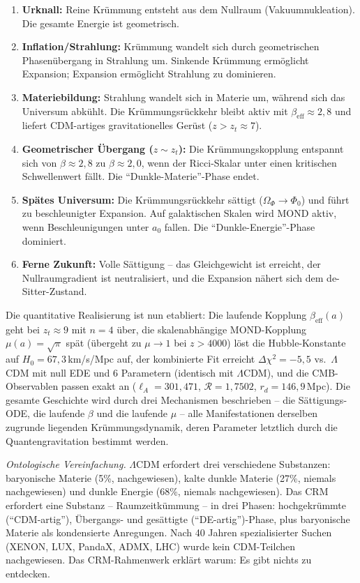 \documentclass[11pt,a4paper]{article}
\begin{document}
\begin{enumerate}
\item \textbf{Urknall:} Reine Kr\"ummung entsteht aus dem Nullraum (Vakuumnukleation). Die gesamte Energie ist geometrisch.
\item \textbf{Inflation/Strahlung:} Kr\"ummung wandelt sich durch geometrischen Phasen\"ubergang in Strahlung um. Sinkende Kr\"ummung erm\"oglicht Expansion; Expansion erm\"oglicht Strahlung zu dominieren.
\item \textbf{Materiebildung:} Strahlung wandelt sich in Materie um, w\"ahrend sich das Universum abk\"uhlt. Die Kr\"ummungsr\"uckkehr bleibt aktiv mit $\beta_{\mathrm{eff}} \approx 2{,}8$ und liefert CDM-artiges gravitationelles Ger\"ust ($z > z_t \approx 7$).
\item \textbf{Geometrischer \"Ubergang ($z \sim z_t$):} Die Kr\"ummungskopplung entspannt sich von $\beta \approx 2{,}8$ zu $\beta \approx 2{,}0$, wenn der Ricci-Skalar unter einen kritischen Schwellenwert f\"allt. Die "`Dunkle-Materie"'-Phase endet.
\item \textbf{Sp\"ates Universum:} Die Kr\"ummungsr\"uckkehr s\"attigt ($\Omega_\Phi \to \Phi_0$) und f\"uhrt zu beschleunigter Expansion. Auf galaktischen Skalen wird MOND aktiv, wenn Beschleunigungen unter $a_0$ fallen. Die "`Dunkle-Energie"'-Phase dominiert.
\item \textbf{Ferne Zukunft:} Volle S\"attigung -- das Gleichgewicht ist erreicht, der Nullraumgradient ist neutralisiert, und die Expansion n\"ahert sich dem de-Sitter-Zustand.
\end{enumerate}

Die quantitative Realisierung ist nun etabliert: Die laufende Kopplung $\beta_{\mathrm{eff}}(a)$ geht bei $z_t \approx 9$ mit $n = 4$ \"uber, die skalenabh\"angige MOND-Kopplung $\mu(a) = \sqrt{\pi}$ sp\"at (\"ubergeht zu $\mu \to 1$ bei $z > 4000$) l\"ost die Hubble-Konstante auf $H_0 = 67{,}3$\,km/s/Mpc auf, der kombinierte Fit erreicht $\Delta\chi^2 = -5{,}5$ vs.\ $\Lambda$CDM mit null EDE und 6 Parametern (identisch mit $\Lambda$CDM), und die CMB-Observablen passen exakt an ($\ell_A = 301{,}471$, $\mathcal{R} = 1{,}7502$, $r_d = 146{,}9$\,Mpc). Die gesamte Geschichte wird durch drei Mechanismen beschrieben -- die S\"attigungs-ODE, die laufende $\beta$ und die laufende $\mu$ -- alle Manifestationen derselben zugrunde liegenden Kr\"ummungsdynamik, deren Parameter letztlich durch die Quantengravitation bestimmt werden.

\textit{Ontologische Vereinfachung.} $\Lambda$CDM erfordert drei verschiedene Substanzen: baryonische Materie (5\%, nachgewiesen), kalte dunkle Materie (27\%, niemals nachgewiesen) und dunkle Energie (68\%, niemals nachgewiesen). Das CRM erfordert eine Substanz -- Raumzeitk\"ummung -- in drei Phasen: hochgekr\"ummte ("`CDM-artig"'), \"Ubergangs- und ges\"attigte ("`DE-artig"')-Phase, plus baryonische Materie als kondensierte Anregungen. Nach 40 Jahren spezialisierter Suchen (XENON, LUX, PandaX, ADMX, LHC) wurde kein CDM-Teilchen nachgewiesen. Das CRM-Rahmenwerk erkl\"art warum: Es gibt nichts zu entdecken.
\end{document}
